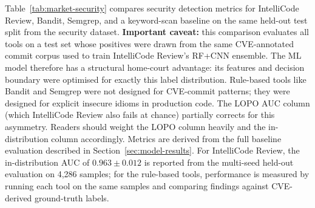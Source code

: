 \documentclass[12pt, oneside]{report}
\begin{document}
Table~\ref{tab:market-security} compares security detection metrics for IntelliCode
Review, Bandit, Semgrep, and a keyword-scan baseline on the same held-out test split
from the security dataset. \textbf{Important caveat:} this comparison evaluates all tools
on a test set whose positives were drawn from the same CVE-annotated commit corpus used to
train IntelliCode Review's RF+CNN ensemble. The ML model therefore has a structural
home-court advantage: its features and decision boundary were optimised for exactly this
label distribution. Rule-based tools like Bandit and Semgrep were not designed for
CVE-commit patterns; they were designed for explicit insecure idioms in production code.
The LOPO AUC column (which IntelliCode Review also fails at chance) partially corrects
for this asymmetry. Readers should weight the LOPO column heavily and the in-distribution
column accordingly. Metrics are derived from the full baseline evaluation described in
Section~\ref{sec:model-results}. For IntelliCode Review, the in-distribution AUC of
$0.963 \pm 0.012$ is reported from the multi-seed held-out evaluation on 4,286 samples;
for the rule-based tools, performance is measured by running each tool on the same
samples and comparing findings against CVE-derived ground-truth labels.

\begin{table}[H]
\centering
\caption{Security vulnerability detection: IntelliCode Review vs.\ static-analysis tools
on the same held-out test set. \textsuperscript{\dag}LOPO AUC measures cross-project
transfer on ten held-out repositories; in-distribution AUC measures held-out test-set
performance on the training distribution. \textsuperscript{\ddag}Bandit's zero F1
reflects label-domain mismatch, not general ineffectiveness (see text).
\textsuperscript{*}In-distribution AUC for IntelliCode Review is optimistically biased
by test-set construction (same CVE corpus as training); the LOPO column is the more
honest estimate of cross-project generalisation.}
\label{tab:market-security}
\end{table}
\end{document}
